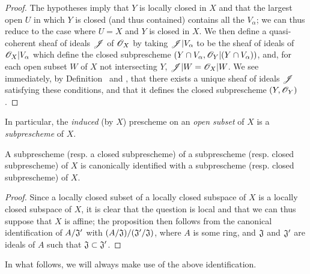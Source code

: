 \begin{proof}
\label{proof-1.4.1.5}
The hypotheses imply that $Y$ is locally closed in $X$ and that the largest open $U$ in which $Y$ is closed (and thus contained) contains all the $V_\alpha$;
we can thus reduce to the case where $U=X$ and $Y$ is closed in $X$.
We then define a quasi-coherent sheaf of ideals $\mathscr{J}$ of $\mathscr{O}_X$ by taking $\mathscr{J}|V_\alpha$ to be the sheaf of ideals of $\mathscr{O}_X|V_\alpha$ which define the closed subprescheme $(Y\cap V_\alpha,\mathscr{O}_Y|(Y\cap V_\alpha))$, and, for each open subset $W$ of $X$ not intersecting $Y$, $\mathscr{J}|W=\mathscr{O}_X|W$.
We see immediately, by Definition~ and , that there exists a unique sheaf of ideals $\mathscr{J}$ satisfying these conditions, and that it defines the closed subprescheme $(Y,\mathscr{O}_Y)$.
\end{proof}

In particular, the \emph{induced} (by $X$) prescheme on an \emph{open subset} of $X$ is a \emph{subprescheme} of $X$.

\begin{prop}[4.1.6]
\label{1.4.1.6}
A subprescheme (resp. a closed subprescheme) of a subprescheme
(resp. closed subprescheme) of $X$ is canonically identified with a subprescheme (resp. closed subprescheme) of $X$.
\end{prop}

\begin{proof}
\label{proof-1.4.1.6}
Since a locally closed subset of a locally closed subspace of $X$ is a locally closed subspace of $X$, it is clear  that the question is local and that we can thus suppose that $X$ is affine;
the proposition then follows from the canonical identification of $A/\mathfrak{J}'$ with $(A/\mathfrak{J})/(\mathfrak{J}'/\mathfrak{J})$, where $A$ is some ring, and $\mathfrak{J}$ and $\mathfrak{J}'$ are ideals of $A$ such that $\mathfrak{J}\subset\mathfrak{J}'$.
\end{proof}

In what follows, we will always make use of the above identification.

